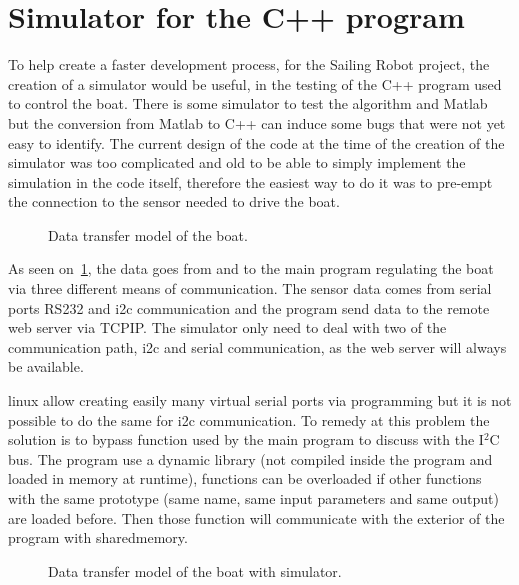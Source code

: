 \section{Simulator for the C++ program}

To help create a faster development process, for the Sailing Robot project, the creation of a simulator would be useful, in the testing of the \gls{C++} program used to control the boat. 
There is some simulator to test the algorithm and Matlab but the conversion from Matlab to C++ can induce some bugs that were not yet easy to identify.
The current design of the code at the time of the creation of the simulator was too complicated and old to be able to simply implement the simulation in the code itself, therefore the easiest way to do it was to pre-empt the connection to the sensor needed to drive the boat.

\begin{figure}[H]
\centering
{} %
{

}
\caption{Data transfer model of the boat.}
\label{fig:model_boat_com}
\end{figure}

As seen on~\ref{fig:model_boat_com}, the data goes from and to the main program regulating the boat via three different means of communication.
The sensor data comes from serial ports \gls{RS232} and \gls{i2c} communication and the program send data to the remote web server via \gls{TCPIP}. The simulator only need to deal with two of the communication path, \gls{i2c} and serial communication, as the web server will always be available. 

\gls{linux} allow creating easily many virtual serial ports via programming but it is not possible to do the same for \gls{i2c} communication. To remedy at this problem the solution is to bypass function used by the main program to discuss with the I$^2$C bus. The program use a dynamic library (not compiled inside the program  and loaded in memory at runtime), functions can be overloaded if other functions with the same prototype (same name, same input parameters and same output) are loaded before. Then those function will communicate with the exterior of the program with \gls{sharedmemory}.

\begin{figure}[H]
\centering
{} %
{

}
\caption{Data transfer model of the boat with simulator.}
\label{fig:model_boat_sim}
\end{figure}

